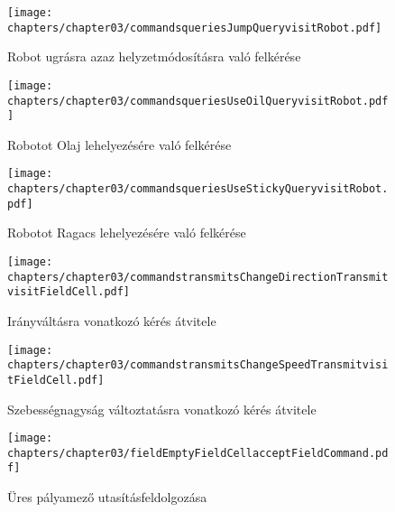 \begin{figure}[h]
	\begin{center}
		\texttt{[image: chapters/chapter03/commandsqueriesJumpQueryvisitRobot.pdf]}
		\caption{Robot ugrásra azaz helyzetmódosításra való felkérése}
		\label{fig:command.executes.JumpQuery.visit}
	\end{center}
\end{figure}

\begin{figure}[h]
	\begin{center}
		\texttt{[image: chapters/chapter03/commandsqueriesUseOilQueryvisitRobot.pdf]}
		\caption{Robotot Olaj lehelyezésére való felkérése}
		\label{fig:command.executes.UseOilQuery.visit}
	\end{center}
\end{figure}

\begin{figure}[h]
	\begin{center}
		\texttt{[image: chapters/chapter03/commandsqueriesUseStickyQueryvisitRobot.pdf]}
		\caption{Robotot Ragacs lehelyezésére való felkérése}
		\label{fig:command.executes.UseStickyQuery.visit}
	\end{center}
\end{figure}

\begin{figure}[h]
	\begin{center}
		\texttt{[image: chapters/chapter03/commandstransmitsChangeDirectionTransmitvisitFieldCell.pdf]}
		\caption{Irányváltásra vonatkozó kérés átvitele}
		\label{fig:command.executes.ChangeDirectionTransmit.visit}
	\end{center}
\end{figure}

\begin{figure}[h]
	\begin{center}
		\texttt{[image: chapters/chapter03/commandstransmitsChangeSpeedTransmitvisitFieldCell.pdf]}
		\caption{Szebességnagyság változtatásra vonatkozó kérés átvitele}
		\label{fig:command.executes.ChangeSpeedTransmit.visit}
	\end{center}
\end{figure}

\begin{figure}[h]
	\begin{center}
		\texttt{[image: chapters/chapter03/fieldEmptyFieldCellacceptFieldCommand.pdf]}
		\caption{Üres pályamező utasításfeldolgozása}
		\label{fig:field.EmptyFieldCell.accept}
	\end{center}
\end{figure}

